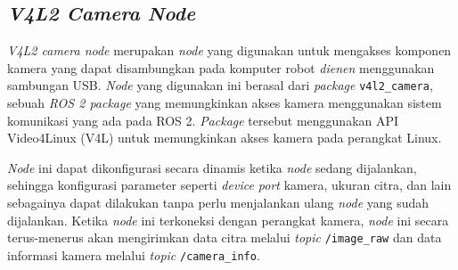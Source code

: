 \subsection{\emph{V4L2 Camera Node}}
\label{subsec:v4l2cameranode}

\emph{V4L2 camera node} merupakan \emph{node} yang digunakan untuk mengakses komponen kamera yang dapat disambungkan pada komputer robot \emph{dienen} menggunakan sambungan USB.
\emph{Node} yang digunakan ini berasal dari \emph{package} \lstinline{v4l2_camera},
  sebuah \emph{ROS 2 package} yang memungkinkan akses kamera menggunakan sistem komunikasi yang ada pada ROS 2.
\emph{Package} tersebut menggunakan API Video4Linux (V4L) \citep{url:video4linux} untuk memungkinkan akses kamera pada perangkat Linux.

\emph{Node} ini dapat dikonfigurasi secara dinamis ketika \emph{node} sedang dijalankan,
  sehingga konfigurasi parameter seperti \emph{device port} kamera, ukuran citra, dan lain sebagainya dapat dilakukan tanpa perlu menjalankan ulang \emph{node} yang sudah dijalankan.
Ketika \emph{node} ini terkoneksi dengan perangkat kamera,
  \emph{node} ini secara terus-menerus akan mengirimkan data citra melalui \emph{topic} \lstinline{/image_raw} dan data informasi kamera melalui \emph{topic} \lstinline{/camera_info}.
